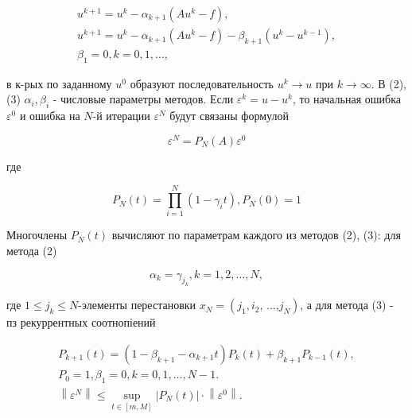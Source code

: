 \documentclass[10pt]{article}
\begin{document}
\[

\begin{gathered}

u^{k+1}=u^{k}-\alpha_{k+1}\left(A u^{k}-f\right), \\

u^{k+1}=u^{k}-\alpha_{k+1}\left(A u^{k}-f\right)-\beta_{k+1}\left(u^{k}-u^{k-1}\right), \\

\beta_{1}=0, k=0,1, \ldots,

\end{gathered}

\]



в к-рых по заданному $u^{0}$ образуют последовательность $u^{k} \rightarrow u$ при $k \rightarrow \infty$. В (2), (3) $\alpha_{i}, \beta_{i}$ - числовые параметры методов. Если $\varepsilon^{k}=u-u^{k}$, то начальная ошибка $\varepsilon^{0}$ и ошибка на $N$-й итерации $\varepsilon^{N}$ будут связаны формулой



\[

\varepsilon^{N}=P_{N}(A) \varepsilon^{0}

\]



где



\[

P_{N}(t)=\prod_{i=1}^{N}\left(1-\gamma_{i} t\right), P_{N}(0)=1

\]



Многочлены $P_{N}(t)$ вычисляют по параметрам каждого из методов (2), (3): для метода (2)



\[

\alpha_{k}=\gamma_{j_{k}}, k=1,2, \ldots, N,

\]



где $1 \leqslant j_{k} \leqslant N$-элементы перестановки $x_{N}=\left(j_{1}, i_{2}\right.$, ...,$\left.j_{N}\right)$, а для метода (3) - пз рекуррентных соотнопіений



\[

\begin{gathered}

P_{k+1}(t)=\left(1-\beta_{k+1}-\alpha_{k+1} t\right) P_{k}(t)+\beta_{k+1} P_{k-1}(t), \\

P_{0}=1, \beta_{1}=0, k=0,1, \ldots, N-1 . \\

\left\|\varepsilon^{N}\right\| \leqslant \sup _{t \in[m, M]}\left|P_{N}(t)\right| \cdot\left\|\varepsilon^{0}\right\| .

\end{gathered}

\]
\end{document}
